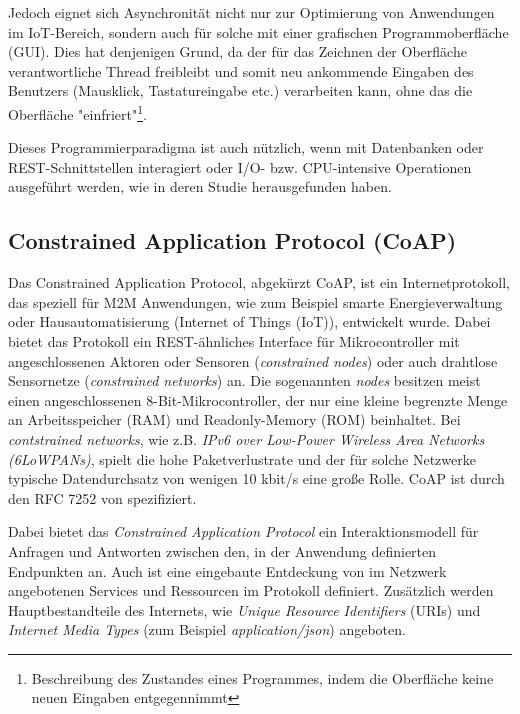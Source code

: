 Jedoch eignet sich Asynchronität nicht nur zur Optimierung von Anwendungen im IoT-Bereich, sondern auch für solche mit einer grafischen Programmoberfläche (GUI). Dies hat denjenigen Grund, da der für das Zeichnen der Oberfläche verantwortliche Thread freibleibt und somit neu ankommende Eingaben des Benutzers (Mausklick, Tastatureingabe etc.) verarbeiten kann, ohne das die Oberfläche "einfriert"\footnote{Beschreibung des Zustandes eines Programmes, indem die Oberfläche keine neuen Eingaben entgegennimmt}.

Dieses Programmierparadigma ist auch nützlich, wenn mit Datenbanken oder REST-Schnittstellen interagiert oder I/O- bzw. CPU-intensive Operationen ausgeführt werden, wie \citeauthor{okur2014study} in deren Studie  \autocite{okur2014study} herausgefunden haben.

\subsection{Constrained Application Protocol (CoAP)}
\label{subsec:constrained-application-protocol}

Das Constrained Application Protocol, abgekürzt CoAP, ist ein Internetprotokoll, das speziell für M2M Anwendungen, wie zum Beispiel smarte Energieverwaltung oder Hausautomatisierung (Internet of Things (IoT)), entwickelt wurde. Dabei bietet das Protokoll ein REST-ähnliches Interface für Mikrocontroller mit angeschlossenen Aktoren oder Sensoren (\textit{constrained nodes}) oder auch drahtlose Sensornetze (\textit{constrained networks}) an. Die sogenannten \textit{nodes} besitzen meist einen angeschlossenen 8-Bit-Mikrocontroller, der nur eine kleine begrenzte Menge an Arbeitsspeicher (RAM) und Readonly-Memory (ROM) beinhaltet. Bei \textit{contstrained networks}, wie z.B. \textit{IPv6 over Low-Power Wireless Area Networks (6LoWPANs)}, spielt die hohe Paketverlustrate und der für solche Netzwerke typische Datendurchsatz von wenigen 10 kbit/s eine große Rolle. CoAP ist durch den RFC 7252 von \citeauthor{RFC7252} \cite{RFC7252} spezifiziert.

Dabei bietet das \textit{Constrained Application Protocol} ein Interaktionsmodell für Anfragen und Antworten zwischen den, in der Anwendung definierten Endpunkten an. Auch ist eine eingebaute Entdeckung von im Netzwerk angebotenen Services und Ressourcen im Protokoll definiert. Zusätzlich werden Hauptbestandteile des Internets, wie \textit{Unique Resource Identifiers} (URIs) und \textit{Internet Media Types} (zum Beispiel \textit{application/json}) angeboten.

